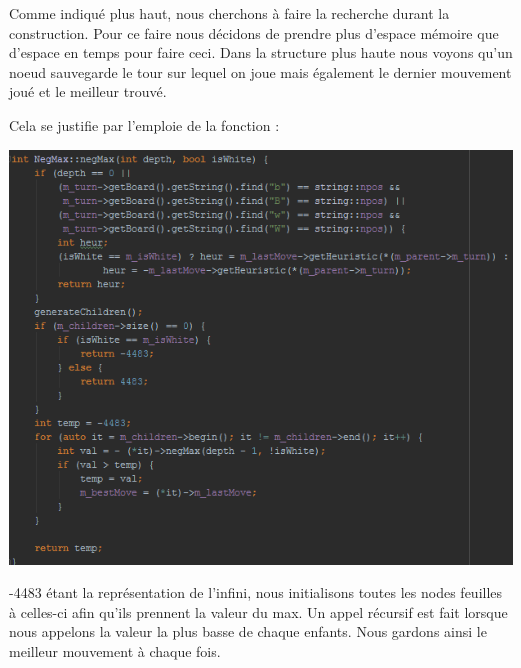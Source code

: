 \documentclass[a4paper]{article}
\begin{document}
Comme indiqué plus haut, nous cherchons à faire la recherche durant la construction. Pour ce faire nous décidons de prendre plus d'espace mémoire que d'espace en temps pour faire ceci. Dans la structure plus haute nous voyons qu'un noeud sauvegarde le tour sur lequel on joue mais également le dernier mouvement joué et le meilleur trouvé.

Cela se justifie par l'emploie de la fonction :
\begin{center}
\includegraphics[scale=.9]{ressources/NegShow.png}
\end{center}

-4483 étant la représentation de l'infini, nous initialisons toutes les nodes feuilles à celles-ci afin qu'ils prennent la valeur du max. Un appel récursif est fait lorsque nous appelons la valeur la plus basse de chaque enfants. Nous gardons ainsi le meilleur mouvement à chaque fois.
\end{document}
